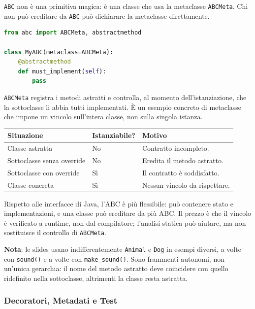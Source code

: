 \documentclass[12pt]{extarticle}
\begin{document}
\noindent \texttt{ABC} non è una primitiva magica: è una classe che usa la metaclasse \texttt{ABCMeta}. Chi non può ereditare da \texttt{ABC} può dichiarare la metaclasse direttamente.

\begin{lstlisting}[language=Python]
from abc import ABCMeta, abstractmethod

class MyABC(metaclass=ABCMeta):
    @abstractmethod
    def must_implement(self):
        pass
\end{lstlisting}

\noindent \texttt{ABCMeta} registra i metodi astratti e controlla, al momento dell'istanziazione, che la sottoclasse li abbia tutti implementati. È un esempio concreto di metaclasse che impone un vincolo sull'intera classe, non sulla singola istanza.

\begin{center}
\small
\begin{tabular}{p{4.6cm}p{5.8cm}p{4.4cm}}
    \toprule
    \textbf{Situazione} & \textbf{Istanziabile?} & \textbf{Motivo} \\
    \midrule
    Classe astratta & No & Contratto incompleto. \\
    \addlinespace
    Sottoclasse senza override & No & Eredita il metodo astratto. \\
    \addlinespace
    Sottoclasse con override & Sì & Il contratto è soddisfatto. \\
    \addlinespace
    Classe concreta & Sì & Nessun vincolo da rispettare. \\
    \bottomrule
\end{tabular}
\end{center}

\noindent Rispetto alle interfacce di Java, l'ABC è più flessibile: può contenere stato e implementazioni, e una classe può ereditare da più ABC. Il prezzo è che il vincolo è verificato a runtime, non dal compilatore; l'analisi statica può aiutare, ma non sostituisce il controllo di \texttt{ABCMeta}.

\noindent \textbf{Nota}: le slides usano indifferentemente \texttt{Animal} e \texttt{Dog} in esempi diversi, a volte con \texttt{sound()} e a volte con \texttt{make\_sound()}. Sono frammenti autonomi, non un'unica gerarchia: il nome del metodo astratto deve coincidere con quello ridefinito nella sottoclasse, altrimenti la classe resta astratta.

\subsubsection{Decoratori, Metadati e Test}
\end{document}
